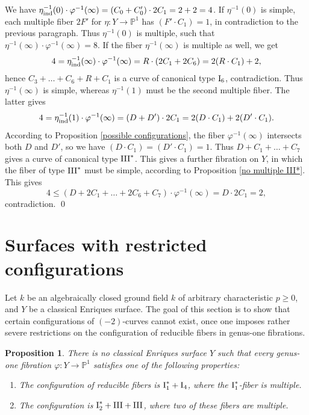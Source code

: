 \documentclass[oneside, 12pt]{amsart}
\newcommand\mylabel[1]{\label{#1}\marginpar{\vspace{-1ex}\medskip\medskip\footnotesize \tt #1}}
\renewcommand\mylabel[1]{\label{#1}}
\newtheorem{proposition}[theorem]{Proposition}
\theoremstyle{definition}
\theoremstyle{remark}
\newcommand{\PP}{\mathbb{P}}
\newcommand{\I}{\text{\rm I}}
\newcommand{\III}{\text{\rm III}}
\newcommand{\ra}{\rightarrow}
\newcommand{\ind}{\text{\rm ind}}
\begin{document}
We have 
$\eta^{-1}_\ind(0)\cdot \varphi^{-1}(\infty) = (C_0+C_0')\cdot 2C_1 =   2+2=4$.
If $\eta^{-1}(0)$ is simple, each multiple fiber $2F'$ for $\eta:Y\ra\PP^1$ has $(F'\cdot C_1) =1$, in contradiction to the previous 
paragraph. Thus $\eta^{-1}(0)$ is multiple, such that  $\eta^{-1}(\infty)\cdot\varphi^{-1}(\infty)= 8$.
If the fiber $\eta^{-1}(\infty)$ is multiple as well, we  get
$$
4=\eta_\ind^{-1}(\infty) \cdot \varphi^{-1}(\infty) = R\cdot (2C_1+2C_6) = 2(R\cdot C_1) + 2,
$$
hence $C_3+\ldots+C_6+R+C_1$ is a curve of canonical type $\I_6$, contradiction.
Thus $\eta^{-1}(\infty)$ is simple, whereas $\eta^{-1}(1)$ must be the second multiple fiber. The latter gives
$$
4=\eta^{-1}_\ind(1)\cdot\varphi^{-1}(\infty) = (D+D')\cdot 2C_1 = 2(D\cdot C_1)+2(D'\cdot C_1).
$$
According to Proposition \ref{possible configurations}, the fiber $\varphi^{-1}(\infty)$ intersects both $D$ and $D'$,
so we have  $(D\cdot C_1)=(D'\cdot C_1)=1$.  
Thus $D+C_1+\ldots+C_7$ gives a curve of canonical type $\III^*$. This gives a further fibration on $Y$, in which 
  the   fiber of type $\III^*$  must be simple, according to Proposition \ref{no multiple III*}. This gives
$$
4\leq (D+2C_1+\ldots+2C_6+C_7)\cdot\varphi^{-1}(\infty)=D\cdot 2C_1=2,
$$
contradiction.
\qed


\section{Surfaces  with restricted configurations}
\mylabel{Restricted configurations}

Let $k$ be an algebraically closed ground field $k$ of arbitrary characteristic $p\geq 0$,
and $Y$ be a classical Enriques surface. The goal of this section is
to show that certain configurations of $(-2)$-curves cannot exist, once one imposes rather severe 
restrictions on the configuration of reducible fibers in genus-one fibrations.

\begin{proposition}
\mylabel{only two configurations}
There is no classical Enriques surface $Y$ such that every genus-one fibration $\varphi:Y\ra\PP^1$
satisfies one of the following properties:
\begin{enumerate}
\item
The configuration of reducible fibers is $\I_1^*+\I_4$, where the $\I_1^*$-fiber is multiple.
\item
The configuration  is $\I_2^*+\III+\III$, where two of these fibers are multiple.
\end{enumerate}
\end{proposition}
\end{document}
